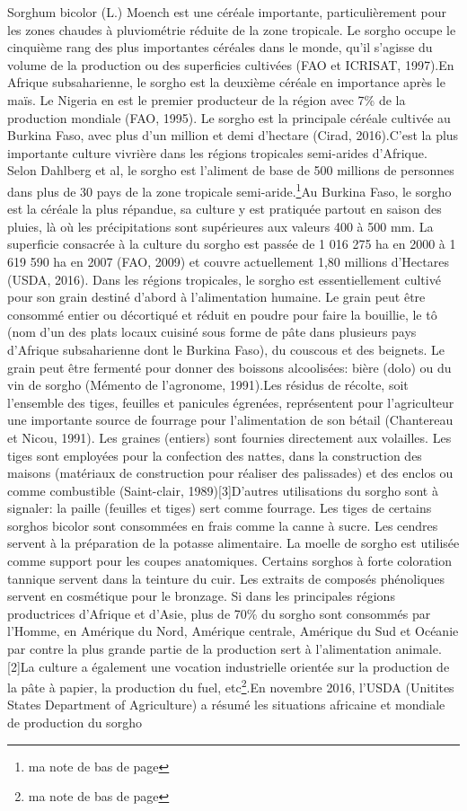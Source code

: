 \documentclass[a4paper,11pt]{article}
\begin{document}
Sorghum bicolor (L.) Moench est une céréale importante,
particulièrement pour les zones chaudes à pluviométrie réduite de la
zone tropicale. Le sorgho occupe le cinquième rang des plus
importantes céréales dans le monde, qu’il s’agisse du volume de la
production ou des superficies cultivées (FAO et ICRISAT, 1997).En
Afrique subsaharienne, le sorgho est la deuxième céréale en importance
après le maïs. Le Nigeria en est le premier producteur de la région
avec 7\% de la production mondiale (FAO, 1995). Le sorgho est la
principale céréale cultivée au Burkina Faso, avec plus d’un million et
demi d’hectare (Cirad, 2016).C’est la plus importante culture vivrière
dans les régions tropicales semi-arides d’Afrique. Selon Dahlberg et
al, le sorgho est l’aliment de base de 500 millions de personnes dans
plus de 30 pays de la zone tropicale semi-aride.\footnote{ma note de
bas de page}Au Burkina Faso, le sorgho est la céréale la plus
répandue, sa culture y est pratiquée partout en saison des pluies, là
où les précipitations sont supérieures aux valeurs 400 à 500 mm. La superficie
consacrée à la culture du sorgho est passée de 1 016 275 ha en 2000 à
1 619 590 ha en 2007 (FAO, 2009) et couvre actuellement 1,80 millions
d’Hectares (USDA, 2016). Dans les régions tropicales, le sorgho est
essentiellement cultivé pour son grain destiné d’abord à
l’alimentation humaine. Le grain peut être consommé entier ou
décortiqué et réduit en poudre pour faire la bouillie, le tô (nom d’un
des plats locaux cuisiné sous forme de pâte dans plusieurs pays
d’Afrique subsaharienne dont le Burkina Faso), du couscous et des
beignets. Le grain peut être fermenté pour donner des boissons
alcoolisées: bière (dolo) ou du vin de sorgho (Mémento de l’agronome,
1991).Les résidus de récolte, soit l’ensemble des tiges, feuilles et
panicules égrenées, représentent pour l’agriculteur une importante
source de fourrage pour l’alimentation de son bétail (Chantereau et
Nicou, 1991). Les graines (entiers) sont fournies directement aux
volailles. Les tiges sont employées pour la confection des nattes,
dans la construction des maisons (matériaux de construction pour
réaliser des palissades) et des enclos ou comme combustible
(Saint-clair, 1989)[3]D’autres utilisations du sorgho sont à
signaler: la paille (feuilles et tiges) sert comme fourrage. Les
tiges de certains sorghos bicolor sont consommées en frais comme la
canne à sucre. Les cendres servent à la préparation de la potasse
alimentaire. La moelle de sorgho est utilisée comme support pour les
coupes anatomiques. Certains sorghos à forte coloration tannique
servent dans la teinture du cuir. Les extraits de composés phénoliques
servent en cosmétique pour le bronzage. Si dans les principales
régions productrices d’Afrique et d’Asie, plus de 70\% du sorgho sont
consommés par l’Homme, en Amérique du Nord, Amérique centrale,
Amérique du Sud et Océanie par contre la plus grande partie de la
production sert à l’alimentation animale.[2]La culture a également une
vocation industrielle orientée sur la production de la pâte à papier,
la production du fuel, etc\footnote{ma note de bas de page}.En
novembre 2016, l’USDA (Unitites States Department of Agriculture) a
résumé les situations africaine et mondiale de production du sorgho
\end{document}
